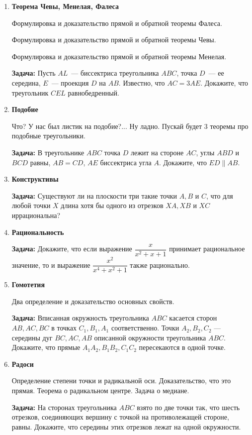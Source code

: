 \documentclass{article}
\begin{document}
\begin{enumerate}[label*=\protect\fbox{\arabic{enumi}}]
\item \textbf{Теорема Чевы, Менелая, Фалеса}

Формулировка и доказательство прямой и обратной теоремы Фалеса.

Формулировка и доказательство прямой и обратной теоремы Чевы.

Формулировка и доказательство прямой и обратной теоремы Менелая.

\textbf{Задача:} Пусть $AL$~--- биссектриса треугольника $ABC$, точка $D$~--- ее середина, $E$~--- проекция $D$ на $AB$. Известно, что $AC = 3AE$. Докажите, что треугольник $CEL$ равнобедренный.

\item \textbf{Подобие}

Что? У нас был листик на подобие?... Ну ладно. Пускай будет 3 теоремы про подобные треугольники.

\textbf{Задача:} В треугольнике $ABC$ точка $D$ лежит на стороне $AC$, углы $ABD$ и $BCD$ равны, $AB = CD$, $AE$ биссектриса угла $A$. Докажите, что $ED \parallel AB$.

\item \textbf{Конструктивы}				

\textbf{Задача:} Существуют ли на плоскости три такие точки $A, B$ и $C$, что для любой точки $X$ длина хотя бы одного из отрезков $XA, XB$ и $XC$ иррациональна?

\item \textbf{Рациональность}			

\textbf{Задача:} Докажите, что если выражение  $\dfrac{x}{x^2 + x + 1}$ принимает рациональное значение, то и выражение  $\dfrac{x^2}{x^4 + x^2 + 1}$  также рационально.

\item \textbf{Гомотетия}						

Два определение и доказательство основных свойств.

\textbf{Задача:} Вписанная окружность треугольника $ABC$ касается сторон $AB, AC, BC$ в точках $C_1, B_1, A_1$ соответственно. Точки $A_2, B_2, C_2$ — середины дуг $BC, AC, AB$ описанной окружности треугольника $ABC$. Докажите, что прямые $A_1A_2, B_1B_2, C_1C_2$ пересекаются в одной точке.

\item \textbf{Радоси}						

Определение степени точки и радикальной оси. Доказательство, что это прямая. Теорема о радикальном центре. Задача о медиане.

\textbf{Задача:} На сторонах треугольника $ABC$ взято по две точки так, что шесть отрезков, соединяющих вершину с точкой на противолежащей стороне, равны. Докажите, что середины этих отрезков лежат на одной окружности.


\end{enumerate}
\end{document}
